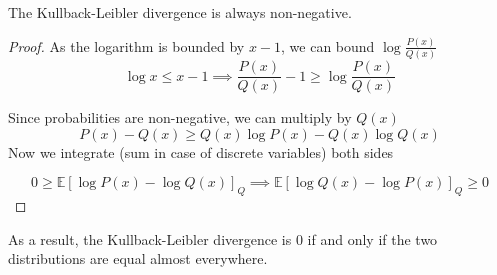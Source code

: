 \begin{proposition}
The Kullback-Leibler divergence is always non-negative.
\end{proposition}
\begin{proof}
  As the logarithm is bounded by \(x - 1\), we can bound \(\log{\frac{P(x)}{Q(x)}}\)
  \[
    \log{x} \leq x - 1 \implies \frac{P(x)}{Q(x)} - 1 \geq \log{\frac{P(x)}{Q(x)}}
  \]

  Since probabilities are non-negative, we can multiply by \(Q(x)\)
  \[
    P(x) - Q(x) \geq Q(x) \log{P(x)} - Q(x) \log{Q(x)}
  \]
  Now we integrate (sum in case of discrete variables) both sides

  \[
    0 \geq \mathbb{E}[\log{P(x)} - \log{Q(x)}]_Q \implies \mathbb{E}[\log{Q(x)}
    - \log{P(x)}]_Q \geq 0
  \]
\end{proof}
As a result, the Kullback-Leibler divergence is \(0\) if and only if the two
distributions are equal almost everywhere.

